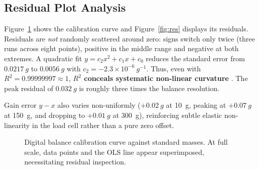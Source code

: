 \documentclass[a4paper, 12pt]{article}
\begin{document}
\subsection{Residual Plot Analysis}
        Figure~\ref{fig:cal} shows the calibration curve and Figure~\ref{fig:res} displays its residuals. Residuals are \emph{not} randomly scattered around zero: signs switch only twice (three runs across eight points), positive in the middle range and negative at both extremes. A quadratic fit $y=c_2x^2+c_1x+c_0$ reduces the standard error from $\SI{0.0217}{g}$ to $\SI{0.0056}{g}$ with $c_2=-2.3\times10^{-6}\ \si{g^{-1}}$. Thus, even with $R^2=0.99999997\approx1$, \textbf{$R^2$ conceals systematic non-linear curvature} \parencite{Yhuwana2026}. The peak residual of $\SI{0.032}{g}$ is roughly three times the balance resolution.

        Gain error $y-x$ also varies non-uniformly ($+\SI{0.02}{g}$ at \SI{10}{g}, peaking at $+\SI{0.07}{g}$ at \SI{150}{g}, and dropping to $+\SI{0.01}{g}$ at \SI{300}{g}), reinforcing subtle elastic non-linearity in the load cell rather than a pure zero offset.
\begin{figure}[H]
\centering
{}
\caption{Digital balance calibration curve against standard masses. At full scale, data points and the OLS line appear superimposed, necessitating residual inspection.}
\label{fig:cal}
\end{figure}
\end{document}
